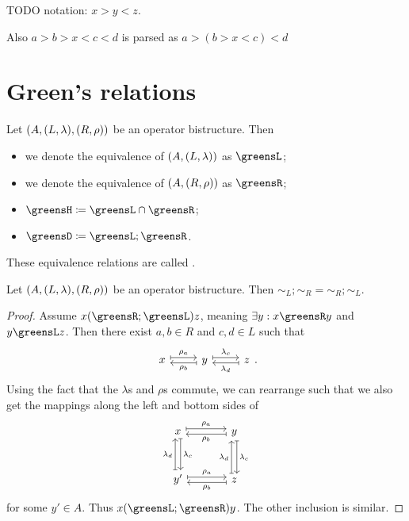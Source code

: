 TODO notation: $x>y<z$.

Also $a>b>x<c<d$ is parsed as $a>(b>x<c)<d$

\section{Green's relations}
\begin{definition}
Let $\left( A, (L, \lambda), (R,\rho) \right)$ be an operator bistructure. Then
\begin{itemize}
\item we denote the equivalence of $\left( A, (L,\lambda) \right)$ as $\greensL$;
\item we denote the equivalence of $\left( A, (R,\rho) \right)$ as $\greensR$;
\item $\greensH \defeq \greensL \cap \greensR$;
\item $\greensD \defeq \greensL;\greensR$.
\end{itemize}
These equivalence relations are called .
\end{definition}

\begin{lemma}
Let $\left( A, (L, \lambda), (R,\rho) \right)$ be an operator bistructure. Then $\sim_L;\sim_R = \sim_R;\sim_L$.
\end{lemma}
\begin{proof}
Assume $x(\greensR;\greensL)z$, meaning $\exists y: x\greensR y$ and $y\greensL z$. Then there exist $a,b\in R$ and $c,d\in L$ such that
\[ \begin{tikzcd}
x \ar[r, maps to, shift left, "\rho_a"] & y \ar[l, maps to, shift left, "\rho_b"] \ar[r, maps to, shift left, "\lambda_c"] & z \ar[l, maps to, shift left, "\lambda_d"]
\end{tikzcd}. \]
Using the fact that the $\lambda$s and $\rho$s commute, we can rearrange such that we also get the mappings along the left and bottom sides of
\[ \begin{tikzcd}[sep=large]
x \ar[r, maps to, shift left, "\rho_a"] \ar[d, maps to, shift left, "\lambda_c"] & y \ar[l, maps to, shift left, "\rho_b"] \ar[d, maps to, shift left, "\lambda_c"] \\
y' \ar[u, maps to, shift left, "\lambda_d"] \ar[r, maps to, shift left, "\rho_a"] & z \ar[u, maps to, shift left, "\lambda_d"] \ar[l, maps to, shift left, "\rho_b"]
\end{tikzcd} \]
for some $y' \in A$. Thus $x(\greensL;\greensR)y$. The other inclusion is similar.
\end{proof}

